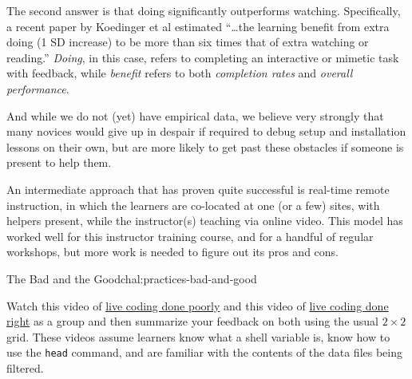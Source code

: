 The second answer is that doing significantly outperforms watching.
Specifically, a recent paper by Koedinger et
al \cite{bib:koedinger-doing-watching} estimated ``{\ldots}the
learning benefit from extra doing (1 SD increase) to be more than six
times that of extra watching or reading.'' \emph{Doing}, in this case,
refers to completing an interactive or mimetic task with feedback,
while \emph{benefit} refers to both \emph{completion rates}
and \emph{overall performance}.

And while we do not (yet) have empirical data, we believe very
strongly that many novices would give up in despair if required to
debug setup and installation lessons on their own, but are more likely
to get past these obstacles if someone is present to help them.

An intermediate approach that has proven quite successful is real-time
remote instruction, in which the learners are co-located at one (or a
few) sites, with helpers present, while the instructor(s) teaching via
online video. This model has worked well for this instructor training
course, and for a handful of regular workshops, but more work is
needed to figure out its pros and cons.


\begin{challenge}{The Bad and the Good}{chal:practices-bad-and-good}

Watch this video of
\href{https://youtu.be/bXxBeNkKmJE}{live coding done poorly}
and this video of
\href{https://youtu.be/SkPmwe\_WjeY}{live coding done right}
as a group and then summarize your feedback on both using the usual
$2{\times}2$ grid.  These videos assume learners know what a shell
variable is, know how to use the \texttt{head} command, and are
familiar with the contents of the data files being filtered.

\end{challenge}

